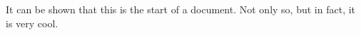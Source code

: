 \documentclass{article}
\begin{document}

	\begin{center}
		It can be shown that this is the start of a document. Not only so, but in fact, it is very cool.
	\end{center}
	

	\pagebreak
	
\end{document}
